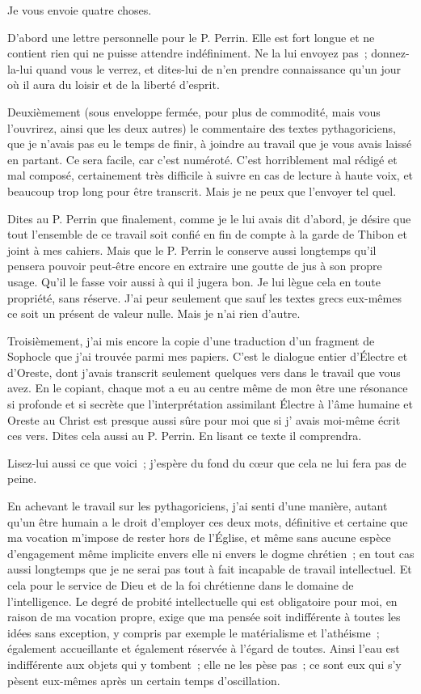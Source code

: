 \documentclass[french,twoside]{book} %
\newcommand{\dateline}[1]{\medskip{\RaggedLeft{#1}\par}\bigskip}
\newcommand{\salute}[1]{\bigbreak{#1}\par\medbreak}
\newcommand\chaptercont{} %
\begin{document}
\dateline{De Casablanca.}

\salute{Chère S.,}

\chaptercont
\noindent Je vous envoie quatre choses.\par
D'abord une lettre personnelle pour le P. Perrin. Elle est fort longue et ne contient rien qui ne puisse attendre indéfiniment. Ne la lui envoyez pas ; donnez-la-lui quand vous le verrez, et dites-lui de n'en prendre connaissance qu'un jour où il aura du loisir et de la liberté d'esprit.\par
Deuxièmement (sous enveloppe fermée, pour plus de commodité, mais vous l'ouvrirez, ainsi que les deux autres) le commentaire des textes pythagoriciens, que je n'avais pas eu le temps de finir, à joindre au travail que je vous avais laissé en partant. Ce sera facile, car c'est numéroté. C'est horriblement mal rédigé et mal composé, certainement très difficile à suivre en cas de lecture à haute voix, et beaucoup trop long pour être transcrit. Mais je ne peux que l'envoyer tel quel.\par
Dites au P. Perrin que finalement, comme je le lui avais dit d'abord, je désire que tout l'ensemble de ce travail soit confié en fin de compte à la garde de Thibon et joint à mes cahiers. Mais que le P. Perrin le conserve aussi longtemps qu'il pensera pouvoir peut-être encore en extraire une goutte de jus à son propre usage. Qu'il le fasse voir aussi à qui il jugera bon. Je lui lègue cela en toute propriété, sans réserve. J'ai peur seulement que sauf les textes grecs eux-mêmes ce soit un présent de valeur nulle. Mais je n'ai rien d'autre.\par
Troisièmement, j'ai mis encore la copie d'une traduction d'un fragment de Sophocle que j'ai trouvée parmi mes papiers. C'est le dialogue entier d'Électre et d'Oreste, dont j'avais transcrit seulement quelques vers dans le travail que vous avez. En le copiant, chaque mot a eu au centre même de mon être une résonance si profonde et si secrète que l'interprétation assimilant Électre à l'âme humaine et Oreste au Christ est presque aussi sûre pour moi que si j' avais moi-même écrit ces vers. Dites cela aussi au P. Perrin. En lisant ce texte il comprendra.\par
Lisez-lui aussi ce que voici ; j'espère du fond du cœur que cela ne lui fera pas de peine.\par
En achevant le travail sur les pythagoriciens, j'ai senti d'une manière, autant qu'un être humain a le droit d'employer ces deux mots, définitive et certaine que ma vocation m'impose de rester hors de l'Église, et même sans aucune espèce d'engagement même implicite envers elle ni envers le dogme chrétien ; en tout cas aussi longtemps que je ne serai pas tout à fait incapable de travail intellectuel. Et cela pour le service de Dieu et de la foi chrétienne dans le domaine de l'intelligence. Le degré de probité intellectuelle qui est obligatoire pour moi, en raison de ma vocation propre, exige que ma pensée soit indifférente à toutes les idées sans exception, y compris par exemple le matérialisme et l'athéisme ; également accueillante et également réservée à l'égard de toutes. Ainsi l'eau est indifférente aux objets qui y tombent ; elle ne les pèse pas ; ce sont eux qui s'y pèsent eux-mêmes après un certain temps d'oscillation.\par
\end{document}
